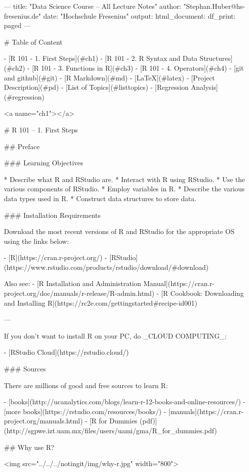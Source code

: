 ---
title: "Data Science Course -- All Lecture Notes"
author: "Stephan.Huber@hs-fresenius.de"
date: "Hochschule Fresenius"
output:
  html_document:
    df_print: paged
---

# Table of Content

- [R 101 - 1. First Steps](#ch1)
- [R 101 - 2. R Syntax and Data Structures](#ch2)
- [R 101 - 3. Functions in R](#ch3)
- [R 101 - 4. Operators](#ch4)
- [git and github](#git)
- [R Markdown](#md)
- [LaTeX](#latex)
- [Project Description](#pd)
- [List of Topics](#listtopics)
- [Regression Analysis](#regression)



<a name="ch1"></a>

# R 101 -- 1. First Steps 

## Preface

### Learning Objectives

* Describe what R and RStudio are.
* Interact with R using RStudio.
* Use the various components of RStudio.
* Employ variables in R.
* Describe the various data types used in R. 
* Construct data structures to store data.


### Installation Requirements

Download the most recent versions of R and RStudio for the appropriate OS using the links below:

 - [R](https://cran.r-project.org/) 
 - [RStudio](https://www.rstudio.com/products/rstudio/download/#download)

Also see:
- [R Installation and Administration Manual](https://cran.r-project.org/doc/manuals/r-release/R-admin.html)
- [R Cookbook: Downloading and Installing R](https://rc2e.com/gettingstarted#recipe-id001)


---

If you don't want to install R on your PC, do _CLOUD COMPUTING_:

 - [RStudio Cloud](https://rstudio.cloud/)

### Sources

There are millions of good and free sources to learn R:

 - [books](http://ucanalytics.com/blogs/learn-r-12-books-and-online-resources/)
 - [more books](https://rstudio.com/resources/books/)
 - [manuals](https://cran.r-project.org/manuals.html)
 - [R for Dummies (pdf)](http://sgpwe.izt.uam.mx/files/users/uami/gma/R_for_dummies.pdf)


## Why use R?


<img src="../../../notingit/img/why-r.jpg" width="800">

